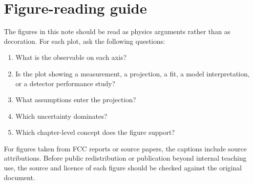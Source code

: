 \documentclass[11pt,a4paper]{article}
\numberwithin{equation}{section}
\begin{document}
\section{Figure-reading guide}
The figures in this note should be read as physics arguments rather than as decoration. For each plot, ask the following questions:
\begin{enumerate}[leftmargin=1.6em]
\item What is the observable on each axis?
\item Is the plot showing a measurement, a projection, a fit, a model interpretation, or a detector performance study?
\item What assumptions enter the projection?
\item Which uncertainty dominates?
\item Which chapter-level concept does the figure support?
\end{enumerate}
For figures taken from FCC reports or source papers, the captions include source attributions. Before public redistribution or publication beyond internal teaching use, the source and licence of each figure should be checked against the original document.
\end{document}
